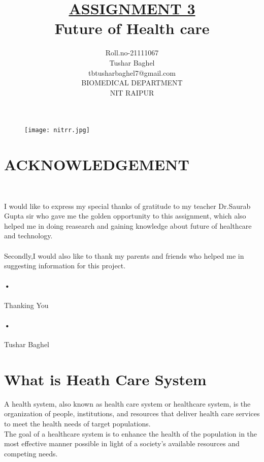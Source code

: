 \documentclass[12pt]{report}
\title{\underline{ASSIGNMENT 3} \\
Future of Health care  }
\author{Roll.no-21111067\\Tushar Baghel\\tbtusharbaghel7@gmail.com\\BIOMEDICAL DEPARTMENT\\NIT RAIPUR\\}
\begin{document}
\begin{figure}
\centering
\texttt{[image: nitrr.jpg]}
\end{figure}
\maketitle
\clearpage
\tableofcontents
\clearpage

\section{ACKNOWLEDGEMENT}\


I would like to express my special thanks of gratitude to my teacher Dr.Saurab Gupta sir who gave me the golden opportunity to this assignment, which also helped me in doing reasearch and gaining knowledge about future of healthcare and technology.\paragraph{}

Secondly,I would also like to thank my parents and friends who helped me in suggesting information for this project.\paragraph{•}


Thanking You\paragraph{•}

Tushar Baghel 

\clearpage


\section{What is Heath Care System}

A health system, also known as health care system or healthcare system, is the organization of people, institutions, and resources that deliver health care services to meet the health needs of target populations.\\
The goal of a healthcare system is to enhance the health of the population in the most effective manner possible in light of a society's available resources and competing needs.
\end{document}
